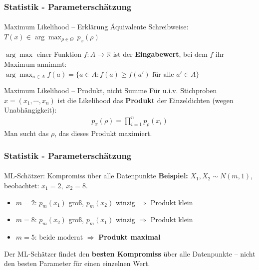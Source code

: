 \documentclass{beamer}
\begin{document}
\begin{frame}
    \frametitle{Statistik - Parameterschätzung}
\framesubtitle{}
\begin{block}{Maximum Likelihood -- Erklärung}
Äquivalente Schreibweise: $T(x) \in \arg\max_{\rho \in \Theta} \, p_x(\rho)$

$\arg\max$ einer Funktion $f: A \to \mathbb{R}$ ist der \textbf{Eingabewert}, bei dem $f$ ihr Maximum annimmt:
$\arg\max_{a \in A} f(a) = \{ a \in A : f(a) \geq f(a') \text{ für alle } a' \in A \}$
\end{block}

\begin{block}{Maximum Likelihood -- Produkt, nicht Summe}
Für u.i.v. Stichproben $x = (x_1, \cdots, x_n)$ ist die Likelihood das \textbf{Produkt} der Einzeldichten (wegen Unabhängigkeit):
\begin{align*}
p_x(\rho) = \prod_{i=1}^n p_\rho(x_i)
\end{align*}
Man sucht das $\rho$, das dieses Produkt maximiert.
\end{block}

 \end{frame}


\begin{frame}
    \frametitle{Statistik - Parameterschätzung}
\framesubtitle{}
\begin{block}{ML-Schätzer: Kompromiss über alle Datenpunkte}
\textbf{Beispiel:} $X_1, X_2 \sim N(m, 1)$, beobachtet: $x_1 = 2,\; x_2 = 8$.
\begin{itemize}
\item $m = 2$: $p_m(x_1)$ groß, $p_m(x_2)$ winzig $\Rightarrow$ Produkt klein
\item $m = 8$: $p_m(x_2)$ groß, $p_m(x_1)$ winzig $\Rightarrow$ Produkt klein
\item $m = 5$: beide moderat $\Rightarrow$ \textbf{Produkt maximal}
\end{itemize}
Der ML-Schätzer findet den \textbf{besten Kompromiss} über alle Datenpunkte -- nicht den besten Parameter für einen einzelnen Wert.
\end{block}

 \end{frame}
\end{document}
